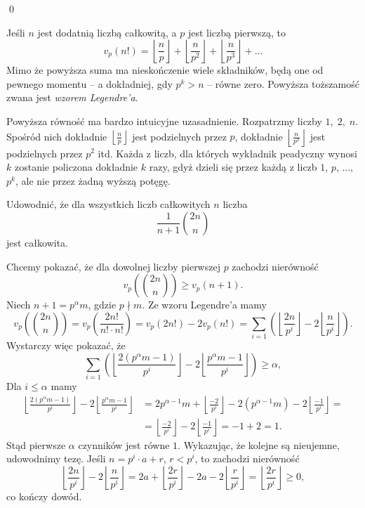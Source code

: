 \qed



\noindent
Jeśli $n$ jest dodatnią liczbą całkowitą, a $p$ jest liczbą pierwszą, to
\[
	v_p(n!) = \left\lfloor \frac{n}{p} \right\rfloor + \left\lfloor \frac{n}{p^2} \right\rfloor + \left\lfloor \frac{n}{p^3} \right\rfloor + ...
\]
Mimo że powyższa suma ma nieskończenie wiele składników, będą one od pewnego momentu -- a dokładniej, gdy $p^k > n$ -- równe zero. Powyższa toższamość zwana jest \textit{wzorem Legendre'a}.

\vspace{10px}

\noindent
Powyższa równość ma bardzo intuicyjne uzasadnienie. Rozpatrzmy liczby $1, \; 2, \; n$. Spośród nich dokładnie $\left\lfloor \frac{n}{p} \right\rfloor$ jest podzielnych przez $p$, dokładnie $\left\lfloor \frac{n}{p^2} \right\rfloor$ jest podzielnych przez $p^2$ itd. Każda z liczb, dla których wykładnik peadyczny wynosi $k$ zostanie policzona dokładnie $k$ razy, gdyż dzieli się przez każdą z liczb $1$, $p$, ..., $p^k$, ale nie przez żadną wyższą potęgę.

\vspace{10px}


\noindent
Udowodnić, że dla wszystkich liczb całkowitych $n$ liczba 
\[
	\frac{1}{n+1}{{2n}\choose{n}}
\]
jest całkowita.

\vspace{5px}


\noindent
Chcemy pokazać, że dla dowolnej liczby pierwszej $p$ zachodzi nierówność
\[
	v_p\left({2n}\choose{n} \right) \geqslant v_p(n + 1).
\]
Niech $n + 1 = p^{\alpha}m$, gdzie $p \nmid m$.
Ze wzoru Legendre'a mamy
\[
	v_p\left({2n}\choose{n} \right) = v_p\left(\frac{2n!}{n! \cdot n!} \right) = v_p\left(2n! \right) - 2v_p\left(n! \right) =  \sum_{i = 1} \left(\left\lfloor \frac{2n}{p^i} \right\rfloor - 2\left\lfloor \frac{n}{p^i} \right\rfloor \right).
\]
Wystarczy więc pokazać, że
\[
	\sum_{i = 1} \left(\left\lfloor \frac{2(p^{\alpha}m - 1)}{p^i} \right\rfloor - 2\left\lfloor \frac{p^{\alpha}m - 1}{p^i} \right\rfloor \right) \geqslant \alpha,
\]
Dla $i \leqslant \alpha$ mamy
\begin{align*}
	\left\lfloor \frac{2(p^{\alpha}m - 1)}{p^i} \right\rfloor - 2\left\lfloor \frac{p^{\alpha}m - 1}{p^i} \right\rfloor &= 2p^{\alpha - 1}m + \left\lfloor \frac{-2}{p^i} \right\rfloor - 2\left(p^{\alpha - 1}m \right) -2\left\lfloor \frac{- 1}{p^i} \right\rfloor = \\
	&= \left\lfloor \frac{-2}{p^i} \right\rfloor - 2\left\lfloor \frac{- 1}{p^i} \right\rfloor = -1 + 2 = 1.
\end{align*}
Stąd pierwsze $\alpha$ czynników jest równe $1$. Wykazując, że kolejne są nieujemne, udowodnimy tezę. Jeśli $n = p^i\cdot a + r$, $r < p^i$, to zachodzi nierówność
\[
	\left\lfloor \frac{2n}{p^i} \right\rfloor - 2\left\lfloor \frac{n}{p^i} \right\rfloor = 2a + \left\lfloor  \frac{2r}{p^i} \right\rfloor - 2a - 2\left\lfloor \frac{r}{p^i} \right\rfloor = \left\lfloor  \frac{2r}{p^i} \right\rfloor \geqslant 0,
\]
co kończy dowód.
